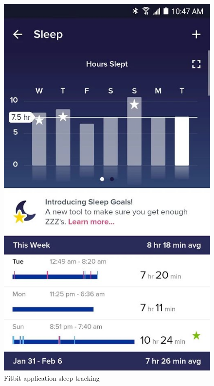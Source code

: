 \begin{figure}[h]
\begin{adjustbox}{width=.4\textwidth,center=\textwidth}
  \centering
  \includegraphics[scale=.5]{images/sleep_tracking.jpg}
\end{adjustbox}
  \caption[Fitbit application sleep tracking]{Fitbit application sleep tracking\footnotemark}
  \label{fig:google_fit}
\end{figure}


